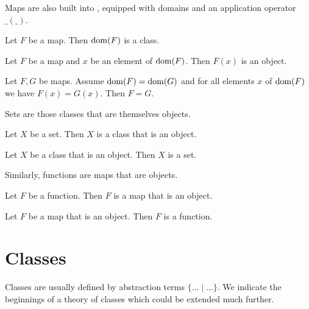 \documentclass{article}
\begin{document}
Maps are also built into \Naproche{}, equipped with
domains and an application operator $\_ ( \_ )$.

\begin{forthel}
  \begin{lemma}
    Let $F$ be a map.
    Then $\operatorname{dom}(F)$ is a class.
  \end{lemma}

  \begin{lemma}
    Let $F$ be a map and $x$ be an element of $\operatorname{dom}(F)$.
    Then $F(x)$ is an object.
  \end{lemma}

  \begin{lemma}
    Let $F, G$ be maps.
    Assume $\operatorname{dom}(F) = \operatorname{dom}(G)$ and for all elements $x$ of $\operatorname{dom}(F)$ we have
    $F(x) = G(x)$.
    Then $F = G$.
  \end{lemma}
\end{forthel}

Sets are those classes that are themselves objects.

\begin{forthel}
  \begin{lemma}
    Let $X$ be a set.
    Then $X$ is a class that is an object.
  \end{lemma}

  \begin{lemma}
    Let $X$ be a class that is an object.
    Then $X$ is a set.
  \end{lemma}
\end{forthel}
%
Similarly, functions are maps that are objects.
\begin{forthel}
  \begin{lemma}
    Let $F$ be a function.
    Then $F$ is a map that is an object.
  \end{lemma}

  \begin{lemma}
    Let $F$ be a map that is an object.
    Then $F$ is a function.
  \end{lemma}
\end{forthel}

\section{Classes}

Classes are usually defined by
abstraction terms $\{ ... \mid ... \}$. We indicate the
beginnings of a theory of classes which could be extended
much further.
\end{document}
